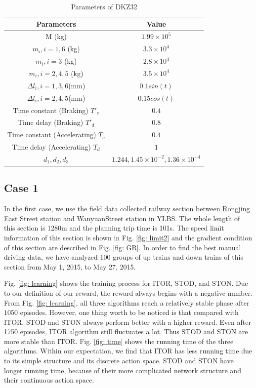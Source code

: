 \documentclass[journal]{IEEEtran}
\begin{document}
\begin{table}[htbp]
	\caption{Parameters of DKZ32}
	\begin{center}
		\begin{tabular}{c|c}
			\hline
			Parameters & Value \\
			\hline
			M (kg) & \(1.99 \times 10^5\) \\
			\(m_i, i =1,6\) (kg) & \(3.3 \times 10^4\) \\
            \(m_i, i=3\) (kg) & \(2.8 \times 10^4\) \\
            \(m_i, i=2,4,5\) (kg) & \(3.5 \times 10^4\) \\
			\(\Delta l_i,i=1,3,6\)(mm) & \(0.1sin(t)\) \\
			\(\Delta l_i,i=2,4,5\)(mm) & \(0.15cos(t)\) \\
			Time constant (Braking) \(T'_c\) & \(0.4\)  \\
			Time delay (Braking) \(T'_d\) & \(0.8\)  \\
			Time constant (Accelerating) \(T_c\) & \(0.4\)  \\
			Time delay (Accelerating) \(T_d\) & \(1\)  \\
			\(d_1, d_2, d_3\)  & \(1.244, 1.45 \times 10^{-2},1.36 \times 10^{-4} \) \\
			\hline
		\end{tabular}
		\label{tab1}
	\end{center}
	\label{tab: tab1}
\end{table}
\subsection{Case 1}
In the first case, we use the field data collected railway section between Rongjing East Street station and WanyuanStreet station in YLBS. The whole length of this section is 1280m and the planning trip time is 101s. The speed limit information of this section is shown in Fig. \ref{fig: limit2} and the gradient condition of this section are described in Fig. \ref{fig: GR}. In order to find the best manual driving data, we have analyzed 100 groups of up trains and down trains of this section from May 1, 2015, to May 27, 2015.

\par Fig. \ref{fig: learning} shows the training process for ITOR, STOD, and STON. Due to our definition of our reward, the reward always begins with a negative number. From Fig. \ref{fig: learning}, all three algorithms reach a relatively stable phase after $1050$ episodes. However, one thing worth to be noticed is that compared with ITOR, STOD and STON always perform better with a higher reward. Even after 1750 episodes, ITOR algorithm still fluctuates a lot. Thus STOD and STON are more stable than ITOR. Fig. \ref{fig: time} shows the running time of the three algorithms. Within our expectation, we find that ITOR has less running time due to its simple structure and its discrete action space. STOD and STON have longer running time, because of their more complicated network structure and their continuous action space. 
\end{document}
